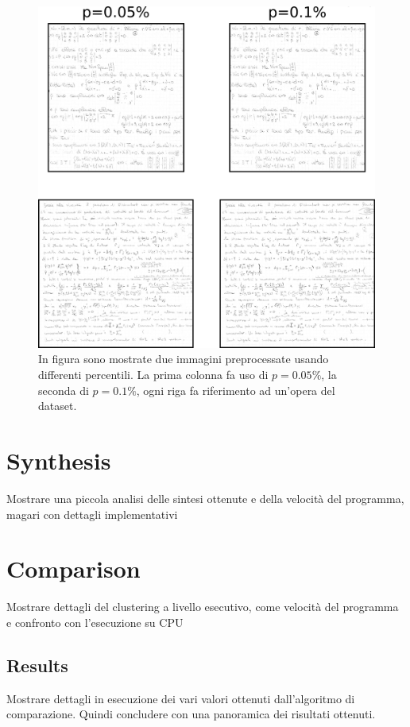 \begin{toDo}
	\begin{figure}[h]
		\centering
		\includegraphics[width=1.0\linewidth]{Figures/fft_results.png}
		\caption[results of "fft cleaner"]{In figura sono mostrate due immagini preprocessate usando differenti percentili. La prima colonna fa uso di $p=0.05\%$, la seconda di $p=0.1\%$, ogni riga fa riferimento ad un'opera del dataset.}
		\label{fig:fft_results}
	\end{figure}

    \section{Synthesis}
    Mostrare una piccola analisi delle sintesi ottenute e della velocità del programma, magari con dettagli implementativi
    \section{Comparison}
   		Mostrare dettagli del clustering a livello esecutivo, come velocità del programma e confronto con l'esecuzione su CPU
    	\subsection{Results}
    		Mostrare dettagli in esecuzione dei vari valori ottenuti dall'algoritmo di comparazione. Quindi concludere con una panoramica dei risultati ottenuti.
\end{toDo}


